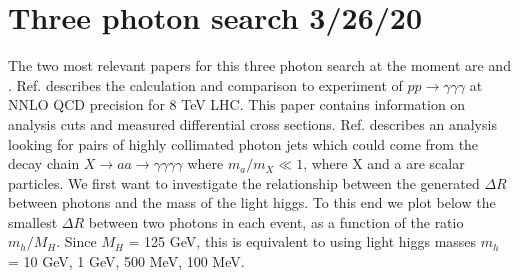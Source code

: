 \documentclass[aps,onecolumn,twoside,secnumarabic,balancelastpage,amsmath,amssymb,nofootinbib,hyperref=pdftex]{revtex4}
\begin{document}
\title{}
\author         {Noah Steinberg}
\date{\today}

\maketitle

\tableofcontents

\section{ Three photon search \tiny{3/26/20}}

The two most relevant papers for this three photon search at the moment are \cite{Chawdhry:2019bji} and \cite{Aaboud:2018djx}. Ref.\cite{Chawdhry:2019bji} describes the calculation and comparison to experiment of $ p p \rightarrow \gamma\gamma\gamma$ at NNLO QCD precision for 8 TeV LHC. This paper contains information on analysis cuts and measured differential cross sections. 
\vskip 0.12in
Ref.\cite{Aaboud:2018djx} describes an analysis looking for pairs of highly collimated photon jets which could come from the decay chain $X\rightarrow aa\rightarrow \gamma\gamma\gamma\gamma$ where $m_{a}/m_{X} \ll 1$, where X and a are scalar particles. 
\vskip 0.12in
We first want to investigate the relationship between the generated $\Delta R$ between photons and the mass of the light higgs. To this end we plot below the smallest $\Delta R$ between two photons in each event, as a function of the ratio $m_{h}/M_{H}$. Since $M_{H}$ = 125 GeV, this is equivalent to using light higgs masses $m_{h}$ = 10 GeV, 1 GeV, 500 MeV, 100 MeV.
\end{document}
